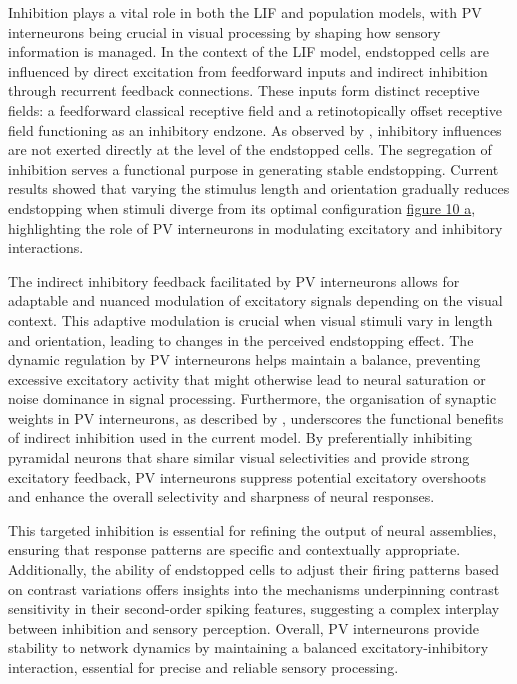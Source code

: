 \documentclass[12pt]{article}
\begin{document}
Inhibition plays a vital role in both the LIF and population models, with PV interneurons being crucial in visual processing by shaping how sensory information is managed. In the context of the LIF model, endstopped cells are influenced by direct excitation from feedforward inputs and indirect inhibition through recurrent feedback connections. These inputs form distinct receptive fields: a feedforward classical receptive field and a retinotopically offset receptive field functioning as an inhibitory endzone. As observed by \textcite{sillitoContributionExcitatoryInhibitory1977}, inhibitory influences are not exerted directly at the level of the endstopped cells. The segregation of inhibition serves a functional purpose in generating stable endstopping. Current results showed that varying the stimulus length and orientation gradually reduces endstopping when stimuli diverge from its optimal configuration \hyperref[fig:endstopping_length]{figure 10 a}, highlighting the role of PV interneurons in modulating excitatory and inhibitory interactions.

The indirect inhibitory feedback facilitated by PV interneurons allows for adaptable and nuanced modulation of excitatory signals depending on the visual context. This adaptive modulation is crucial when visual stimuli vary in length and orientation, leading to changes in the perceived endstopping effect. The dynamic regulation by PV interneurons helps maintain a balance, preventing excessive excitatory activity that might otherwise lead to neural saturation or noise dominance in signal processing. Furthermore, the organisation of synaptic weights in PV interneurons, as described by \textcite{znamenskiyFunctionalSpecificityRecurrent2024}, underscores the functional benefits of indirect inhibition used in the current model. By preferentially inhibiting pyramidal neurons that share similar visual selectivities and provide strong excitatory feedback, PV interneurons suppress potential excitatory overshoots and enhance the overall selectivity and sharpness of neural responses.

This targeted inhibition is essential for refining the output of neural assemblies, ensuring that response patterns are specific and contextually appropriate. Additionally, the ability of endstopped cells to adjust their firing patterns based on contrast variations offers insights into the mechanisms underpinning contrast sensitivity in their second-order spiking features, suggesting a complex interplay between inhibition and sensory perception. Overall, PV interneurons provide stability to network dynamics by maintaining a balanced excitatory-inhibitory interaction, essential for precise and reliable sensory processing.
\end{document}

